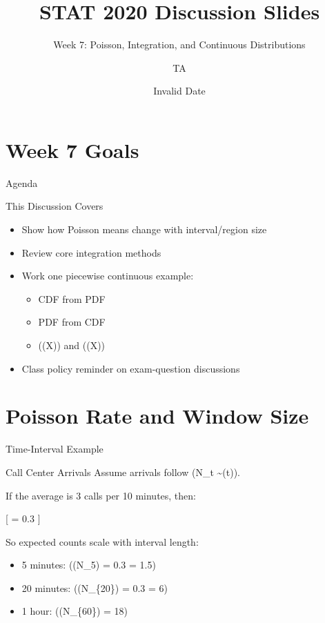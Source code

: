 \documentclass[
  ignorenonframetext,
]{beamer}
\title{STAT 2020 Discussion Slides}
\subtitle{Week 7: Poisson, Integration, and Continuous Distributions}
\author{TA}
\date{Invalid Date}
\institute{University of Iowa}
\providecommand{\tightlist}{%
  \setlength{\itemsep}{0pt}\setlength{\parskip}{0pt}}
\begin{document}
\frame{\titlepage}


\section{Week 7 Goals}\label{week-7-goals}

\begin{frame}{Agenda}
\label{agenda}
\begin{block}{This Discussion Covers}
\label{this-discussion-covers}
\begin{itemize}
\tightlist
\item
  Show how Poisson means change with interval/region size
\item
  Review core integration methods
\item
  Work one piecewise continuous example:

  \begin{itemize}
  \tightlist
  \item
    CDF from PDF
  \item
    PDF from CDF
  \item
    (\Ex(X)) and (\Var(X))
  \end{itemize}
\item
  Class policy reminder on exam-question discussions
\end{itemize}
\end{block}
\end{frame}

\section{Poisson Rate and Window
Size}\label{poisson-rate-and-window-size}

\begin{frame}{Time-Interval Example}
\label{time-interval-example}
\begin{block}{Call Center Arrivals}
\label{call-center-arrivals}
Assume arrivals follow (N\_t \sim \Pois(\lambda t)).

If the average is 3 calls per 10 minutes, then:

{[} \lambda = 0.3  {]}

So expected counts scale with interval length:

\begin{itemize}
\tightlist
\item
  5 minutes: (\Ex(N\_5) = 0.3  = 1.5)
\item
  20 minutes: (\Ex(N\_\{20\}) = 0.3  = 6)
\item
  1 hour: (\Ex(N\_\{60\}) = 18)
\end{itemize}
\end{block}
\end{frame}
\end{document}
